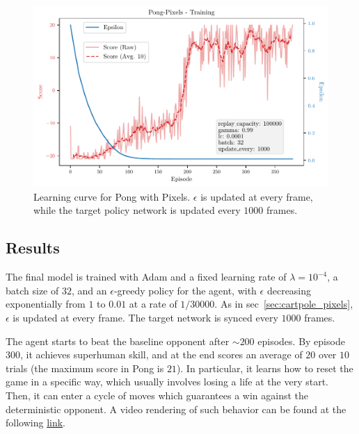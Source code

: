 \documentclass[11pt,a4paper]{scrartcl}
\begin{document}
\begin{figure}[H]
    \centering
    \includegraphics[width=\textwidth]{../Code/Plots/3/25_06_21-22h54m13}
    \caption{Learning curve for Pong with Pixels. $\epsilon$ is updated at every frame, while the target policy network is updated every $1000$ frames. \label{fig:pong_lr}}
\end{figure}

\subsection{Results}
The final model is trained with Adam and a fixed learning rate of $\lambda = 10^{-4}$, a batch size of $32$, and an $\epsilon$-greedy policy for the agent, with $\epsilon$ decreasing exponentially from $1$ to $0.01$ at a rate of $1 / \num{30000}$. As in sec~\ref{sec:cartpole_pixels}, $\epsilon$ is updated at every frame. The target network is synced every $1000$ frames. 

\medskip

The agent starts to beat the baseline opponent after $\sim 200$ episodes. By episode $300$, it achieves superhuman skill, and at the end scores an average of $20$ over $10$ trials (the maximum score in Pong is $21$). In particular, it learns how to reset the game in a specific way, which usually involves losing a life at the very start. Then, it can enter a cycle of moves which guarantees a win against the deterministic opponent. A video rendering of such behavior can be found at the following \href{https://github.com/Einlar/DLNN_Assignments/tree/main/3/Code/video/03_Pong_pixels_solved}{link}.



\printbibliography
\end{document}
